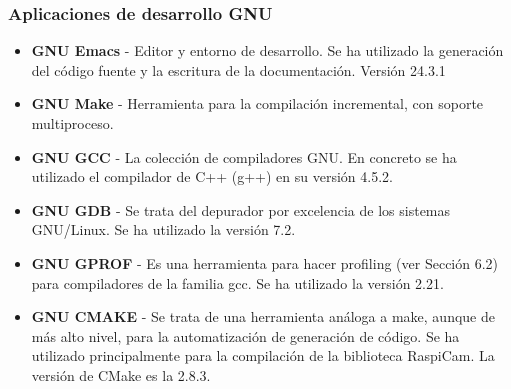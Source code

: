 \subsubsection{Aplicaciones de desarrollo GNU}
\begin{itemize}
\item \textbf{GNU Emacs} - Editor y entorno de desarrollo. Se ha utilizado la generación del código fuente y la escritura de la documentación. Versión 24.3.1
\item \textbf{GNU Make} - Herramienta para la compilación incremental, con soporte multiproceso.
\item \textbf{GNU GCC} - La colección de compiladores GNU. En concreto se ha utilizado el compilador de C++ (g++) en su versión 4.5.2.
\item \textbf{GNU GDB} - Se trata del depurador por excelencia de los sistemas GNU/Linux. Se ha utilizado la versión 7.2.
\item \textbf{GNU GPROF} - Es una herramienta para hacer profiling (ver Sección 6.2) para compiladores de la familia gcc. Se ha utilizado la versión 2.21.
\item \textbf{GNU CMAKE} - Se trata de una herramienta análoga a make, aunque de más alto nivel, para la automatización de generación de código. Se ha utilizado principalmente para la compilación de la biblioteca RaspiCam. La versión de CMake es la 2.8.3. 
\end{itemize}

